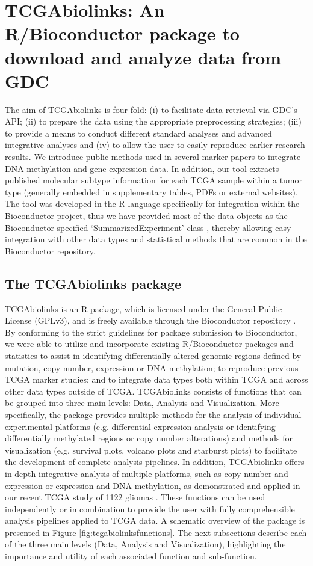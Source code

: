 \section{TCGAbiolinks: An R/Bioconductor package to download and analyze data from GDC}

The aim of TCGAbiolinks is four-fold: (i) to facilitate
data retrieval via GDC’s API; (ii) to prepare the data
using the appropriate preprocessing strategies; (iii) to provide
a means to conduct different standard analyses and
advanced integrative analyses and (iv) to allow the user to
easily reproduce earlier research results.
We introduce public methods
used in several marker papers to integrate DNA methylation
and gene expression data. In addition, our tool extracts
published molecular subtype information for each
TCGA sample within a tumor type (generally embedded in
supplementary tables, PDFs or external websites). The tool was developed in the  R language specifically
for integration within the Bioconductor project, thus we have provided most of the data objects as the Bioconductor specified
‘SummarizedExperiment’ class \cite{huber2015orchestrating},
thereby allowing easy integration with other data types and statistical
methods that are common in the Bioconductor repository.

\subsection{The TCGAbiolinks package}
TCGAbiolinks is an R package, which is licensed under
the General Public License (GPLv3), and is freely available
through the Bioconductor repository \cite{gentleman2004bioconductor}. By conforming to the strict guidelines for package submission to
Bioconductor, we were able to utilize and incorporate existing R/Bioconductor packages and statistics to assist in identifying differentially altered genomic regions defined by mutation, copy number, expression or DNA methylation; to reproduce previous TCGA marker studies; and to integrate data types both within TCGA and across other data types outside of TCGA. TCGAbiolinks consists of functions that can be grouped into three main levels: Data, Analysis and Visualization. More specifically, the package provides multiple methods for the analysis of individual experimental platforms (e.g. differential expression analysis or identifying
differentially methylated regions or copy number alterations) and methods for visualization (e.g. survival plots, volcano plots and starburst plots) to facilitate the development of complete analysis pipelines. In addition, TCGAbiolinks
offers in-depth integrative analysis of multiple platforms,
such as copy number and expression or expression
and DNA methylation, as demonstrated and applied in our
recent TCGA study of 1122 gliomas \cite{ceccarelli2016molecular}. These functions
can be used independently or in combination to provide the
user with fully comprehensible analysis pipelines applied to
TCGA data. A schematic overview of the package is presented
in Figure \ref{fig:tcgabiolinksfunctions}. The next subsections describe each of the three main levels (Data, Analysis and Visualization), highlighting the importance and utility of each associated function and sub-function.

